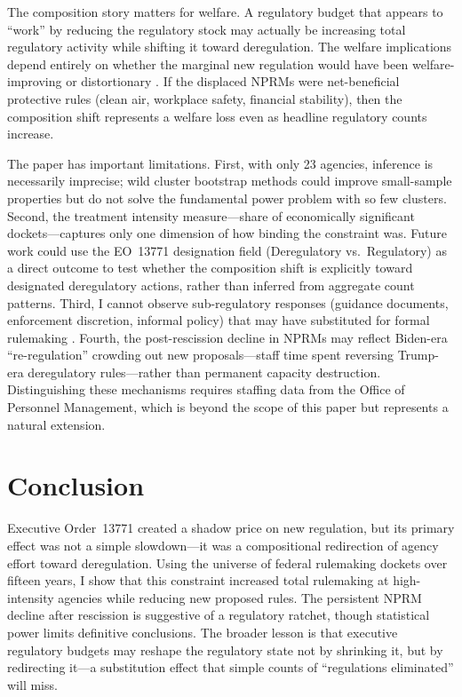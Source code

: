\documentclass[12pt]{article}
\begin{document}
The composition story matters for welfare. A regulatory budget that appears to ``work'' by reducing the regulatory stock may actually be increasing total regulatory activity while shifting it toward deregulation. The welfare implications depend entirely on whether the marginal new regulation would have been welfare-improving or distortionary \citep{greenstone2002impacts, sunstein2020cost}. If the displaced NPRMs were net-beneficial protective rules (clean air, workplace safety, financial stability), then the composition shift represents a welfare loss even as headline regulatory counts increase.

The paper has important limitations. First, with only 23 agencies, inference is necessarily imprecise; wild cluster bootstrap methods could improve small-sample properties but do not solve the fundamental power problem with so few clusters. Second, the treatment intensity measure---share of economically significant dockets---captures only one dimension of how binding the constraint was. Future work could use the EO~13771 designation field (Deregulatory vs.\ Regulatory) as a direct outcome to test whether the composition shift is explicitly toward designated deregulatory actions, rather than inferred from aggregate count patterns. Third, I cannot observe sub-regulatory responses (guidance documents, enforcement discretion, informal policy) that may have substituted for formal rulemaking \citep{balla2020regulatory}. Fourth, the post-rescission decline in NPRMs may reflect Biden-era ``re-regulation'' crowding out new proposals---staff time spent reversing Trump-era deregulatory rules---rather than permanent capacity destruction. Distinguishing these mechanisms requires staffing data from the Office of Personnel Management, which is beyond the scope of this paper but represents a natural extension.

\section{Conclusion}
\label{sec:conclusion}

Executive Order~13771 created a shadow price on new regulation, but its primary effect was not a simple slowdown---it was a compositional redirection of agency effort toward deregulation. Using the universe of federal rulemaking dockets over fifteen years, I show that this constraint increased total rulemaking at high-intensity agencies while reducing new proposed rules. The persistent NPRM decline after rescission is suggestive of a regulatory ratchet, though statistical power limits definitive conclusions. The broader lesson is that executive regulatory budgets may reshape the regulatory state not by shrinking it, but by redirecting it---a substitution effect that simple counts of ``regulations eliminated'' will miss.
\end{document}
